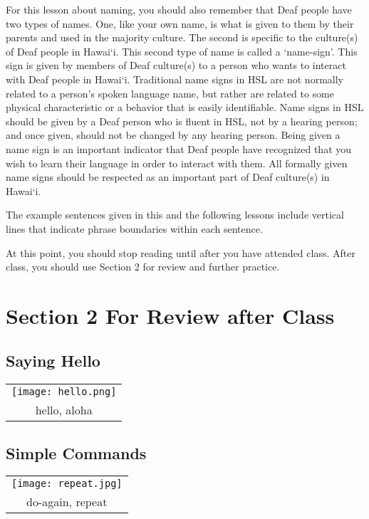 \documentclass{tufte-book}
\begin{document}
For this lesson about naming, you should also remember that Deaf people have two types of names. One, like your own name, is what is given to them by their parents and used in the majority culture. The second is specific to the culture(s) of Deaf people in Hawai`i. This second type of name is called a `name-sign'. This sign is given by members of Deaf culture(s) to a person who wants to interact with Deaf people in Hawai`i. Traditional name signs in HSL are not normally related to a person’s spoken language name, but rather are related to some physical characteristic or a behavior that is easily identifiable. Name signs in HSL should be given by a Deaf person who is fluent in HSL, not by a hearing person; and once given, should not be changed by any hearing person. Being given a name sign is an important indicator that Deaf people have recognized that you wish to learn their language in order to interact with them. All formally given name signs should be respected as an important part of Deaf culture(s) in Hawai`i.

The example sentences given in this and the following lessons include vertical lines that indicate phrase boundaries within each sentence. 

At this point, you should stop reading until after you have attended class. After class, you should use Section 2 for review and further practice.
\newpage

\section{Section 2 For Review after Class}

\subsection{Saying Hello}


\begin{table}[h!]
\begin{tabular}{c}

\texttt{[image: hello.png]}\\
\footnotesize hello, aloha\\
\end{tabular}
\end{table}




\subsection{Simple Commands}
\begin{table}[h!]
\begin{tabular}{c}

\texttt{[image: repeat.jpg]}\\
\footnotesize do-again, repeat\\
\end{tabular}
\end{table}
\end{document}
